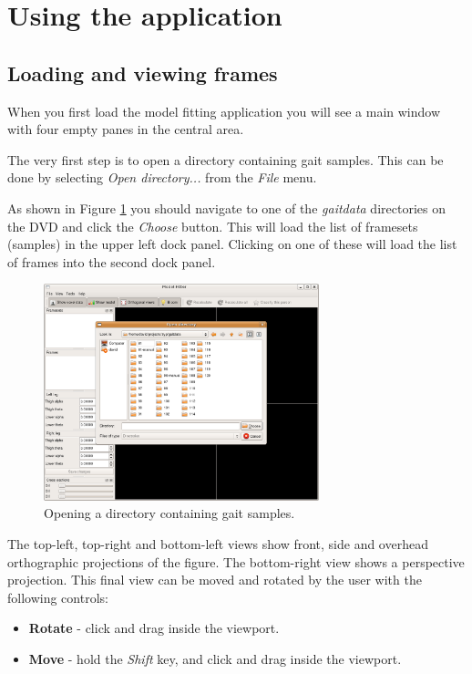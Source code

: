 \section{Using the application}

\subsection{Loading and viewing frames}

When you first load the model fitting application you will see a main window with four empty panes in the central area.

The very first step is to open a directory containing gait samples.
This can be done by selecting \emph{Open directory...} from the \emph{File} menu.

As shown in Figure \ref{manual:opendir} you should navigate to one of the \emph{gaitdata} directories on the DVD and click the \emph{Choose} button.
This will load the list of framesets (samples) in the upper left dock panel.
Clicking on one of these will load the list of frames into the second dock panel.

\begin{figure}[htb]
	\centering
	\includegraphics[width=8cm]{manual/opendir.png}
	\caption{Opening a directory containing gait samples.}
	\label{manual:opendir}
\end{figure}

The top-left, top-right and bottom-left views show front, side and overhead orthographic projections of the figure.
The bottom-right view shows a perspective projection.
This final view can be moved and rotated by the user with the following controls:

\begin{itemize}
	\item \textbf{Rotate} - click and drag inside the viewport.
	\item \textbf{Move} - hold the \emph{Shift} key, and click and drag inside the viewport.
\end{itemize}

